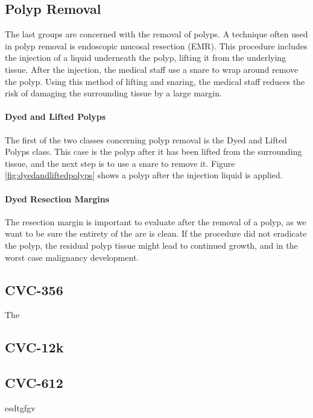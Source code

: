 \subsection{Polyp Removal}
The last groups are concerned with the removal of polyps. A technique often used in polyp removal is endoscopic mucosal resection (EMR). 
This procedure includes the injection of a liquid underneath the polyp, lifting it from the underlying tissue. After the injection, the medical staff use a snare to wrap around remove the polyp. Using this method of lifting and snaring, the medical staff reduces the risk of damaging the surrounding tissue by a large margin.

\paragraph{Dyed and Lifted Polyps}
The first of the two classes concerning polyp removal is the Dyed and Lifted Polyps class. This case is the polyp after it has been lifted from the surrounding tissue, and the next step is to use a snare to remove it.
Figure \ref{fig:dyedandliftedpolyps} shows a polyp after the injection liquid is applied. 


\paragraph{Dyed Resection Margins}
The resection margin is important to evaluate after the removal of a polyp, as we want to be sure the entirety of the are is clean. 
If the procedure did not eradicate the polyp, the residual polyp tissue might lead to continued growth, and in the worst case malignancy development. 




\subsection{CVC-356}
The 

\subsection{CVC-12k}
\subsection{CVC-612}
esdtgfgv

